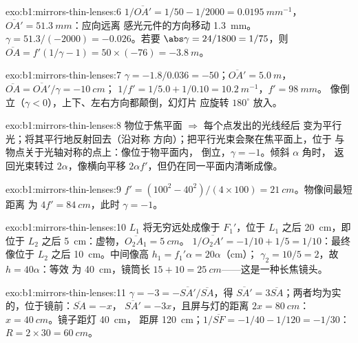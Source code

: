 \begin{solution}{exo:b1:mirrors-thin-lenses:6}
$1/\overline{OA'} = 1/50 - 1/2000 = \qty{0.0195}{mm^{-1}}$，
$\overline{OA'} = \qty{51.3}{mm}$：应向远离
感光元件的方向移动 \qty{1.3}{mm}。$\gamma = 51.3/(-2000) = -0.026$。若要 $\abs\gamma = 24/1800
= 1/75$，则 $\overline{OA} = f'(1/\gamma - 1) = 50 \times (-76) =
\qty{-3.8}{m}$。
\end{solution}

\begin{solution}{exo:b1:mirrors-thin-lenses:7}
$\gamma = -1.8/0.036 = -50$；$\overline{OA'} = \qty{5.0}{m}$，
$\overline{OA} = \overline{OA'}/\gamma = \qty{-10}{cm}$；
$1/f' = 1/5.0 + 1/0.10 = \qty{10.2}{m^{-1}}$，$f' = \qty{98}{mm}$。
像倒立（$\gamma < 0$），上下、左右方向都颠倒，幻灯片
应旋转 $180^\circ$ 放入。
\end{solution}

\begin{solution}{exo:b1:mirrors-thin-lenses:8}
物位于焦平面 $\Rightarrow$ 每个点发出的光线经后
变为平行光；将其平行地反射回去（沿对称
方向）；把平行光束会聚在焦平面上，位于
与物点关于光轴对称的点上：像位于物平面内，
倒立，$\gamma = -1$。倾斜 $\alpha$ 角时，
返回光束转过 $2\alpha$，像横向平移
$2\alpha f'$，但仍在同一平面内清晰成像。
\end{solution}

\begin{solution}{exo:b1:mirrors-thin-lenses:9}
$f' = (100^2 - 40^2)/(4 \times 100) = \qty{21}{cm}$。物像间最短距离
为 $4f' = \qty{84}{cm}$，此时 $\gamma = -1$。
\end{solution}

\begin{solution}{exo:b1:mirrors-thin-lenses:10}
$L_1$ 将无穷远处成像于 $F_1'$，位于 $L_1$ 之后 \qty{20}{cm}，即
位于 $L_2$ 之后 \qty{5}{cm}：虚物，$\overline{O_2A_1} = \qty{+5}{cm}$。
$1/\overline{O_2A'} = -1/10 + 1/5 = 1/10$：最终像位于
$L_2$ 之后 \qty{10}{cm}。中间像高 $h_1 = f_1'\alpha = 20\alpha$（cm）；
$\gamma_2 = 10/5 = 2$，故 $h = 40\alpha$：等效
为 \qty{40}{cm}，镜筒长 $15 + 10 = \qty{25}{cm}$——这是一种长焦镜头。
\end{solution}

\begin{solution}{exo:b1:mirrors-thin-lenses:11}
$\gamma = -3 = -\overline{SA'}/\overline{SA}$，得 $\overline{SA'} =
3\overline{SA}$；两者均为实的，位于镜前：$\overline{SA} = -x$，
$\overline{SA'} = -3x$，且屏与灯的距离 $2x = \qty{80}{cm}$：
$x = \qty{40}{cm}$。镜子距灯 \qty{40}{cm}，
距屏 \qty{120}{cm}；$1/\overline{SF} = -1/40 - 1/120 = -1/30$：
$R = 2 \times 30 = \qty{60}{cm}$。
\end{solution}

